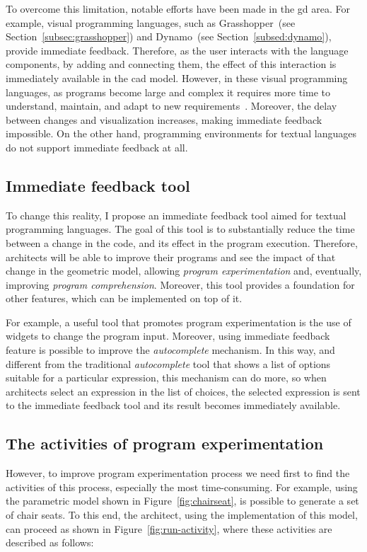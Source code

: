 To overcome this limitation, notable efforts have been made in the \gls{gd} area. For example, visual programming languages, such as Grasshopper~(see Section~\ref{subsec:grasshopper}) and Dynamo~(see Section~\ref{subsed:dynamo}), provide immediate feedback. Therefore, as the user interacts with the language components, by adding and connecting them, the effect of this interaction is immediately available in the \gls{cad} model. However, in these visual programming languages, as programs become large and complex it requires more time to understand, maintain, and adapt to new requirements~\citep{leitao2011programming}. Moreover, the delay between changes and visualization increases, making immediate feedback impossible. On the other hand, programming environments for textual languages do not support immediate feedback at all.

\subsection{Immediate feedback tool}

To change this reality, I propose an immediate feedback tool aimed for textual programming languages. The goal of this tool is to substantially reduce the time between a change in the code, and its effect in the program execution. Therefore, architects will be able to improve their programs and see the impact of that change in the geometric model, allowing \textit{program experimentation} and, eventually, improving \textit{program comprehension}. Moreover, this tool provides a foundation for other features, which can be implemented on top of it. 

For example, a useful tool that promotes program experimentation is the use of widgets to change the program input. Moreover, using immediate feedback feature is possible to improve the \textit{autocomplete} mechanism. In this way, and different from the traditional \textit{autocomplete} tool that shows a list of options suitable for a particular expression, this mechanism can do more, so when architects select an expression in the list of choices, the selected expression is sent to the immediate feedback tool and its result becomes immediately available.


\subsection{The activities of program experimentation}

However, to improve program experimentation process we need first to find the activities of this process, especially the most time-consuming. For example, using the parametric model shown in Figure~\ref{fig:chairseat}, is possible to generate a set of chair seats. To this end, the architect, using the implementation of this model, can proceed as shown in Figure~\ref{fig:run-activity}, where these activities are described as follows:


